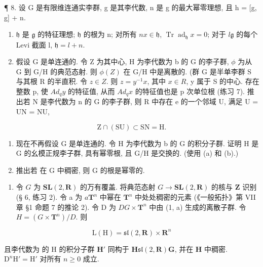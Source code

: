 ¶ 8. 设 G 是有限维连通实李群, g 是其李代数, n 是 g 的最大幂零理想, 且 h = {[}g, g{]} + n.

\begin{enumerate}
\def\labelenumi{(\alph{enumi})}
\item
  \(\mathfrak{h}\) 是 \(\mathfrak{g}\) 的特征理想; \(\mathfrak{h}\) 的根为 n; 对所有 \(n\)\(x \in \mathfrak{h}\), \(\operatorname{Tr} \operatorname{ad}_{\mathfrak{h}} x = 0\); 对于 \(l\)\(\mathfrak{g}\) 的每个 Levi 截面 l, \(\mathfrak{h} = l + n\).
\item
  假设 G 是单连通的. 令 Z 为其中心, H 为李代数为 b 的 G 的李子群, \(\phi\) 为从 G 到 G/H 的典范态射. 则 \(\phi(Z)\) 在 G/H 中是离散的. (群 G 是半单李群 S 与其根 R 的半直积. 令 \(z \in Z\). 则 \(z = y^{-1}x\), 其中 \(x \in R\), y 属于 S 的中心. 存在整数 p, 使 \(Ad_{q}y\) 的特征值, 从而 \(Ad_{q}x\) 的特征值也是 p 次单位根 (练习 7). 推出若 N 是李代数为 n 的 G 的李子群, 则 R 中存在 e 的一个邻域 U, 满足 U = UN = NU,
\end{enumerate}

\[
\mathrm{Z} \cap (\mathrm{SU}) \subset \mathrm{SN} = \mathrm{H}.
\]

\begin{enumerate}
\def\labelenumi{(\alph{enumi})}
\setcounter{enumi}{2}
\item
  现在不再假设 G 是单连通的. 令 H 为李代数为 b 的 G 的积分子群. 证明 H 是 G 的幺模正规李子群, 具有幂零根, 且 G/H 是交换的. (使用 (a) 和 (b).)
\item
  推出若  在 G 中稠密, 则 G 的根是幂零的.
\end{enumerate}

\begin{enumerate}
\def\labelenumi{\arabic{enumi}.}
\setcounter{enumi}{8}
\tightlist
\item
  令 \(G\) 为 \(\mathbf{SL}(2, \mathbf{R})\) 的万有覆盖. 将典范态射 \(G \to \mathbf{SL}(2, \mathbf{R})\) 的核与 \(\mathbf{Z}\) 识别 (§ 6, 练习 2). 令 a 为 \(a\)\(\mathbf{T}^n\) 中幂在 \(\mathbf{T}^n\) 中处处稠密的元素 (《一般拓扑》第 VII 章 §1 命题 7 的推论 2). 令 D 为 \(D\)\(G \times \mathbf{T}^n\) 中由 (1, a) 生成的离散子群. 令 \(H = (G \times \mathbf{T}^n)/D\). 则
\end{enumerate}

\[
\mathrm{L} (\mathrm{H}) = \mathfrak {s l} (2, \mathbf {R}) \times \mathbf {R} ^ {n}
\]

且李代数为  的 H 的积分子群 \(\mathbf{H}'\) 同构于 \(\mathbf{H}\)\(\mathfrak{sl}(2,\mathbf{R})\)\(\mathbf{G}\), 并在 \(\mathbf{H}\) 中稠密. \(\mathrm{D}^n\mathrm{H}' = \mathrm{H}'\) 对所有 \(n\geqslant 0\) 成立.

